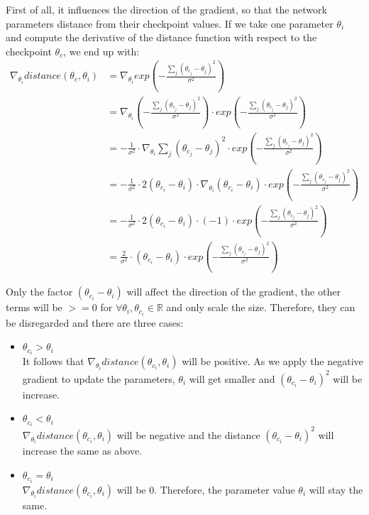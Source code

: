 First of all, it influences the direction of the gradient, so that the network
parameters distance from their checkpoint values. If we take one parameter
$\theta_i$ and compute the derivative of the distance function with respect to
the checkpoint $\theta_c$, we end up with:
\begin{align}
    \nabla_{\theta_i} distance(\theta_c, \theta_i)
    &= \nabla_{\theta_i} exp(-\frac{\sum_j (\theta_{c_j}-\theta_{j})^2}{\sigma^2}) \\
    &= \nabla_{\theta_i} (-\frac{\sum_j (\theta_{c_j}-\theta_{j})^2}{\sigma^2}) \cdot exp(-\frac{\sum_j (\theta_{c_j}-\theta_{j})^2}{\sigma^2}) \\
    &= -\frac{1}{\sigma^2} \cdot \nabla_{\theta_i} \sum_j (\theta_{c_j}-\theta_{j})^2 \cdot exp(-\frac{\sum_j (\theta_{c_j}-\theta_{j})^2}{\sigma^2}) \\
    &= -\frac{1}{\sigma^2} \cdot 2 (\theta_{c_i} - \theta_i) \cdot \nabla_{\theta_i}(\theta_{c_i} - \theta_i) \cdot exp(-\frac{\sum_j (\theta_{c_j}-\theta_{j})^2}{\sigma^2}) \\
    &= -\frac{1}{\sigma^2} \cdot 2 (\theta_{c_i} - \theta_i) \cdot (-1) \cdot exp(-\frac{\sum_j (\theta_{c_j}-\theta_{j})^2}{\sigma^2}) \\
    &= \frac{2}{\sigma^2} \cdot (\theta_{c_i} - \theta_i) \cdot exp(-\frac{\sum_j (\theta_{c_j}-\theta_{j})^2}{\sigma^2}) 
\end{align}

Only the factor $(\theta_{c_i} - \theta_i)$ will affect the direction of the
gradient, the other terms will be $>=0$ for $\forall \theta_i , \theta_{c_i}\in
\mathbb{R}$ and only scale the size. Therefore, they can be disregarded and
there are three cases:
\begin{itemize}
    \item $\theta_{c_i} > \theta_i$\\
        It follows that $\nabla_{\theta_i} distance(\theta_{c_i}, \theta_i)$
        will be positive. As we apply the negative gradient to update the
        parameters, $\theta_i$ will get smaller and  $(\theta_{c_i} - \theta_i)^2$
        will be increase.
    \item $\theta_{c_i} < \theta_i$\\
        $\nabla_{\theta_i} distance(\theta_{c_i}, \theta_i)$ will be negative
        and the distance $(\theta_{c_i} - \theta_i)^2$ will increase the same as
        above.
    \item $\theta_{c_i} = \theta_i$\\
        $\nabla_{\theta_i} distance(\theta_{c_i}, \theta_i)$ will be 0.
        Therefore, the parameter value $\theta_i$ will stay the same.
\end{itemize} 

